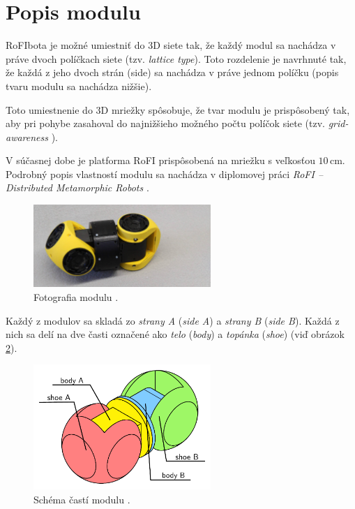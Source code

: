 \documentclass[
  digital, %
  oneside, %
  table,   %
  lof,     %
  nolot,     %
]{fithesis3}
\begin{document}
\section{Popis modulu}
\label{sec:moduleSpec}
RoFIbota je možné umiestniť do 3D siete tak, že každý modul sa nachádza v práve dvoch políčkach siete (tzv. \textit{lattice type}). Toto rozdelenie je navrhnuté tak, že každá z jeho dvoch strán (side) sa nachádza v práve jednom políčku (popis tvaru modulu sa nachádza nižšie). 

Toto umiestnenie do 3D mriežky spôsobuje, že tvar modulu je prispôsobený tak, aby pri pohybe zasahoval do najnižšieho možného počtu políčok siete (tzv. \textit{grid-awareness} \cite{mrazekMasterThesis}). 

V súčasnej dobe je platforma RoFI prispôsobená na mriežku s veľkosťou $10$\,cm. Podrobný popis vlastností modulu sa nachádza v diplomovej práci \textit{RoFI – Distributed Metamorphic Robots} \cite{mrazekMasterThesis}. 

\begin{figure}[hbt!]
    \centering
    \includegraphics[width=0.6\textwidth]{pictures/module.jpg}
    \caption[Fotografia modulu]{Fotografia modulu \cite{rofiWeb}.}
    \label{fig:module}
\end{figure}

Každý z modulov sa skladá zo \textit{strany A} (\textit{side A}) a \textit{strany B} (\textit{side B}). Každá z nich sa delí na dve časti označené ako \textit{telo} (\textit{body}) a \textit{topánka} (\textit{shoe}) (viď obrázok \ref{fig:module_parts}). 

\begin{figure}[hbt!]
    \centering
    \includegraphics[width=0.6\textwidth]{pictures/module_parts.pdf}
    \caption[Časti modulu]{Schéma častí modulu \cite{mrazekMasterThesis}.}
    \label{fig:module_parts}
\end{figure}
\end{document}
